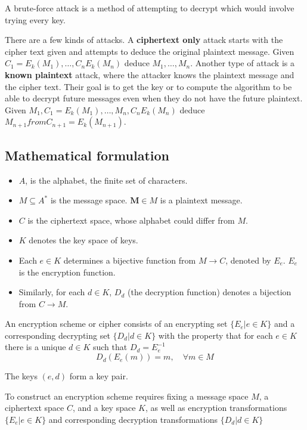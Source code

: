 \documentclass[11pt]{article}
\begin{document}
A brute-force attack is a method of attempting to decrypt which would involve trying every key.

There are a few kinds of attacks.
A \textbf{ciphertext only} attack starts with the cipher text given and attempts to deduce the original plaintext message.
Given $C_1 = E_k (M_1), \dots, C_n E_k (M_n)$ deduce $M_1, \dots, M_n$.
Another type of attack is a \textbf{known plaintext} attack, where the attacker knows the plaintext message and the cipher text.
Their goal is to get the key or to compute the algorithm to be able to decrypt future messages even when they do not have the future plaintext.
Given $M_1, C_1 = E_k (M_1), \dots, M_n, C_n E_k (M_n)$ deduce $M_{n+1} from C_{n+1} = E_k (M_{n+1})$.

\subsection{Mathematical formulation}
\begin{itemize}
    \item $A$, is the alphabet, the finite set of characters.
    \item $M \subseteq A^*$ is the message space. $\textbf{M} \in M $ is a plaintext message.
    \item $C$ is the ciphertext space, whose alphabet could differ from $M$.
    \item $K$ denotes the key space of keys.
    \item Each $e \in K$ determines a bijective function from $M \to C$, denoted by $E_e$. $E_e$ is the encryption function.
    \item Similarly, for each $d \in K$, $D_d$ (the decryption function) denotes a bijection from $C \to M$.
\end{itemize}

An encryption scheme or cipher consists of an encrypting set $\{ E_e | e \in K \}$ and a corresponding decrypting set $ \{ D_d | d \in K \}$ with the property that for each $e \in K$ there is a unique $d \in K$ such that $D_d = E_e^{-1}$
\begin{equation}
    D_d(E_e(m)) = m, \quad \forall m \in M
\end{equation}

The keys $(e,d)$ form a key pair.

To construct an encryption scheme requires fixing a message space $M$, a ciphertext space $C$, and a key space $K$, as well as encryption transformations $\{ E_e | e \in K \}$ and corresponding decryption transformations $\{ D_d | d \in K  \}$
\end{document}
